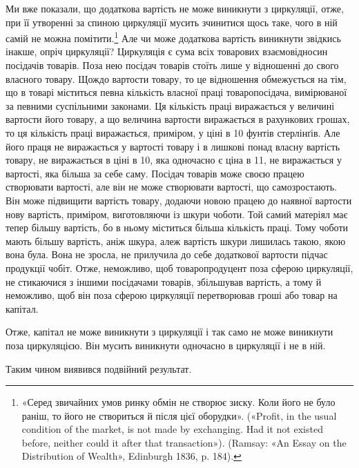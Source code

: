 Ми вже показали, що додаткова вартість не може виникнути
з циркуляції, отже, при її утворенні за спиною циркуляції мусить
зчинитися щось таке, чого в ній самій не можна помітити.\footnote{
«Серед звичайних умов ринку обмін не створює зиску. Коли його
не було раніш, то його не створиться й після цієї оборудки». («Profit, in
the usual condition of the market, is not made by exchanging. Had it not
existed before, neither could it after that transaction»). (Ramsay: «An
Essay on the Distribution of Wealth», Edinburgh 1836, p. 184).
} Але
чи може додаткова вартість виникнути звідкись інакше, опріч
циркуляції? Циркуляція є сума всіх товарових взаємовідносин
посідачів товарів. Поза нею посідач товарів стоїть лише у відношенні
до свого власного товару. Щождо вартости товару, то це
відношення обмежується на тім, що в товарі міститься певна
кількість власної праці товаропосідача, вимірюваної за певними
суспільними законами. Ця кількість праці виражається у величині
вартости його товару, а що величина вартости виражається
в рахункових грошах, то ця кількість праці виражається, приміром,
у ціні в 10 фунтів стерлінґів. Але його праця не виражається
у вартості товару і в лишкові понад власну вартість товару,
не виражається в ціні в 10, яка одночасно є ціна в 11, не виражається
у вартості, яка більша за себе саму. Посідач товарів
може своєю працею створювати вартості, але він не може створювати
вартості, що самозростають. Він може підвищити вартість
товару, додаючи новою працею до наявної вартости нову вартість,
приміром, виготовляючи із шкури чоботи. Той самий матеріял
має тепер більшу вартість, бо в ньому міститься більша кількість
праці. Тому чоботи мають більшу вартість, аніж шкура, алеж вартість
шкури лишилась такою, якою вона була. Вона не зросла,
не прилучила до себе додаткової вартости підчас продукції чобіт.
Отже, неможливо, щоб товаропродуцент поза сферою циркуляції,
не стикаючися з іншими посідачами товарів, збільшував вартість,
а тому й неможливо, щоб він поза сферою циркуляції перетворював
гроші або товар на капітал.

Отже, капітал не може виникнути з циркуляції і так само не
може виникнути поза циркуляцією. Він мусить виникнути одночасно
в циркуляції і не в ній.

Таким чином виявився подвійний результат.

